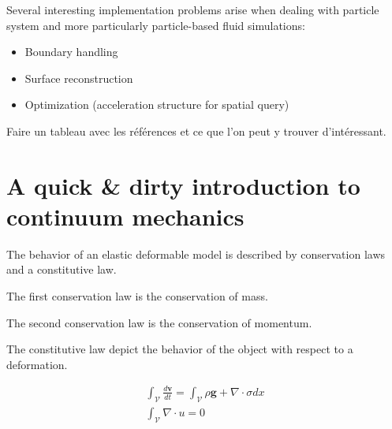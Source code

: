 \documentclass[11pt, oneside, a4paper]{memoir}
\begin{document}
Several interesting implementation problems arise when dealing with particle system and more particularly particle-based fluid simulations:

\begin{itemize}
\item Boundary handling 
\item Surface reconstruction
\item Optimization (acceleration structure for spatial query)
\end{itemize}

Faire un tableau avec les références et ce que l'on peut y trouver d'intéressant.


\section[A quick \& dirty introduction to continuum mechanics]{A quick \& dirty introduction to continuum mechanics}

The behavior of an elastic deformable model is described by conservation laws and a constitutive law.

The first conservation law is the conservation of mass.

The second conservation law is the conservation of momentum.

The constitutive law depict the behavior of the object with respect to a deformation.

\begin{equation}
\begin{array}{ll}
\int_{\mathcal{V}} \frac{d\mathbf{v}}{dt} = \int_{\mathcal{V}} \rho \mathbf{g} + \nabla \cdot \sigma dx 
\\
\int_{\mathcal{V}} \nabla \cdot u = 0
\end{array}
\end{equation} 
\end{document}
